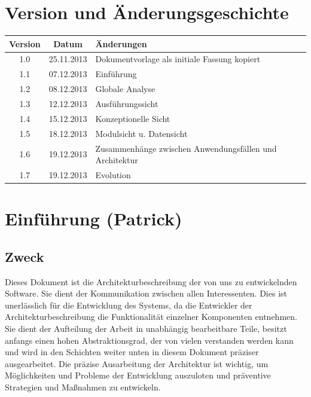 \documentclass[fontsize=12pt,paper=a4,twoside]{scrartcl}
\begin{document}
\listoftables

\clearpage

\section*{Version und Änderungsgeschichte}

\begin{tabular}{ccl}
Version & Datum & Änderungen \\
\hline
1.0 & 25.11.2013 & Dokumentvorlage als initiale Fassung kopiert \\
1.1 & 07.12.2013 & Einführung \\
1.2 & 08.12.2013 & Globale Analyse \\
1.3 & 12.12.2013 & Ausführungssicht \\
1.4 & 15.12.2013 & Konzeptionelle Sicht \\
1.5 & 18.12.2013 & Modulsicht u. Datensicht \\
1.6 & 19.12.2013 & Zusammenhänge zwischen Anwendungsfällen und Architektur\\
1.7 & 19.12.2013 & Evolution \\
\end{tabular}


\section{Einführung (Patrick)}

\subsection{Zweck}

Dieses Dokument ist die Architekturbeschreibung der von uns zu entwickelnden Software. Sie dient der Kommunikation zwischen allen Interessenten. Dies ist unerlässlich für die Entwicklung des Systems, da die Entwickler der Architekturbeschreibung die Funktionalität einzelner Komponenten entnehmen. Sie dient der Aufteilung der Arbeit in unabhängig bearbeitbare Teile, besitzt anfangs einen hohen Abstraktionsgrad, der von vielen verstanden werden kann und wird in den Schichten weiter unten in diesem Dokument präziser ausgearbeitet. Die präzise Ausarbeitung der Architektur ist wichtig, um Möglichkeiten und Probleme der Entwicklung auszuloten und präventive Strategien und Maßnahmen zu entwickeln.
\end{document}

